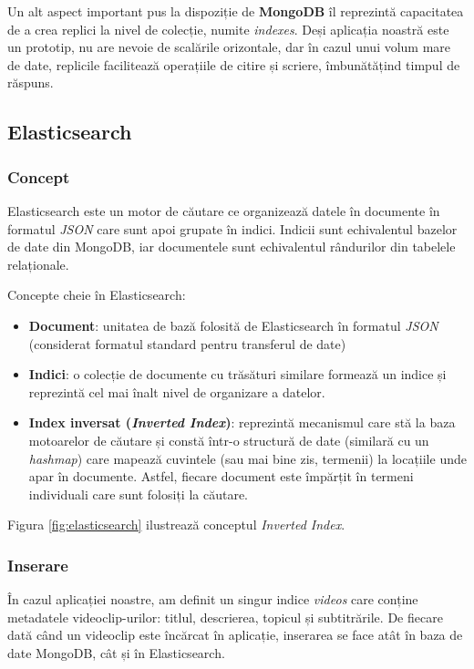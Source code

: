 \par
Un alt aspect important pus la dispoziție de \textbf{MongoDB} îl reprezintă capacitatea de a crea replici
la nivel de colecție, numite \textit{indexes}. Deși aplicația noastră este un prototip, nu are nevoie 
de scalările orizontale, dar în cazul unui volum mare de date, replicile facilitează operațiile de
citire și scriere, îmbunătățind timpul de răspuns.

\subsection{Elasticsearch}
\subsubsection{Concept}
Elasticsearch este un motor de căutare ce organizează datele în documente în formatul \textit{JSON} care
sunt apoi grupate în indici. Indicii sunt echivalentul bazelor de date din MongoDB, iar documentele sunt
echivalentul rândurilor din tabelele relaționale.

\par
Concepte cheie în Elasticsearch:
\begin{itemize}
    \item \textbf{Document}: unitatea de bază folosită de Elasticsearch în formatul \textit{JSON}
    (considerat formatul standard pentru transferul de date)
    \item \textbf{Indici}: o colecție de documente cu trăsături similare formează un indice și reprezintă
    cel mai înalt nivel de organizare a datelor.
    \item \textbf{Index inversat (\textit{Inverted Index})}: reprezintă mecanismul care stă la baza motoarelor de căutare și constă
    într-o structură de date (similară cu un \textit{hashmap}) care mapează cuvintele (sau mai bine zis, termenii)
    la locațiile unde apar în documente. Astfel, fiecare document este împărțit în termeni individuali 
    care sunt folosiți la căutare.
\end{itemize}

\par
Figura \ref{fig:elasticsearch} ilustrează conceptul \textit{Inverted Index}. \cite{elasticsearchexplained}

\subsubsection{Inserare}
\par
În cazul aplicației noastre, am definit un singur indice \textit{videos} care conține metadatele
videoclip-urilor: titlul, descrierea, topicul și subtitrările. De fiecare dată când un videoclip
este încărcat în aplicație, inserarea se face atât în baza de date MongoDB, cât și în Elasticsearch.

